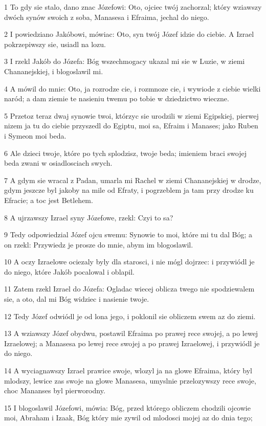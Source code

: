 \par 1 To gdy sie stalo, dano znac Józefowi: Oto, ojciec twój zachorzal; który wziawszy dwóch synów swoich z soba, Manasesa i Efraima, jechal do niego.
\par 2 I powiedziano Jakóbowi, mówiac: Oto, syn twój Józef idzie do ciebie. A Izrael pokrzepiwszy sie, usiadl na lozu.
\par 3 I rzekl Jakób do Józefa: Bóg wszechmogacy ukazal mi sie w Luzie, w ziemi Chananejskiej, i blogoslawil mi.
\par 4 A mówil do mnie: Oto, ja rozrodze cie, i rozmnoze cie, i wywiode z ciebie wielki naród; a dam ziemie te nasieniu twemu po tobie w dziedzictwo wieczne.
\par 5 Przetoz teraz dwaj synowie twoi, którzyc sie urodzili w ziemi Egipskiej, pierwej nizem ja tu do ciebie przyszedl do Egiptu, moi sa, Efraim i Manases; jako Ruben i Symeon moi beda.
\par 6 Ale dzieci twoje, które po tych splodzisz, twoje beda; imieniem braci swojej beda zwani w osiadlosciach swych.
\par 7 A gdym sie wracal z Padan, umarla mi Rachel w ziemi Chananejskiej w drodze, gdym jeszcze byl jakoby na mile od Efraty, i pogrzeblem ja tam przy drodze ku Efracie; a toc jest Betlehem.
\par 8 A ujrzawszy Izrael syny Józefowe, rzekl: Czyi to sa?
\par 9 Tedy odpowiedzial Józef ojcu swemu: Synowie to moi, które mi tu dal Bóg; a on rzekl: Przywiedz je prosze do mnie, abym im blogoslawil.
\par 10 A oczy Izraelowe ociezaly byly dla starosci, i nie mógl dojrzec: i przywiódl je do niego, które Jakób pocalowal i oblapil.
\par 11 Zatem rzekl Izrael do Józefa: Ogladac wiecej oblicza twego nie spodziewalem sie, a oto, dal mi Bóg widziec i nasienie twoje.
\par 12 Tedy Józef odwiódl je od lona jego, i poklonil sie obliczem swem az do ziemi.
\par 13 A wziawszy Józef obydwu, postawil Efraima po prawej rece swojej, a po lewej Izraelowej; a Manasesa po lewej rece swojej a po prawej Izraelowej, i przywiódl je do niego.
\par 14 A wyciagnawszy Izrael prawice swoje, wlozyl ja na glowe Efraima, który byl mlodszy, lewice zas swoje na glowe Manasesa, umyslnie przelozywszy rece swoje, choc Mananses byl pierworodny.
\par 15 I blogoslawil Józefowi, mówia: Bóg, przed którego obliczem chodzili ojcowie moi, Abraham i Izaak, Bóg który mie zywil od mlodosci mojej az do dnia tego;
